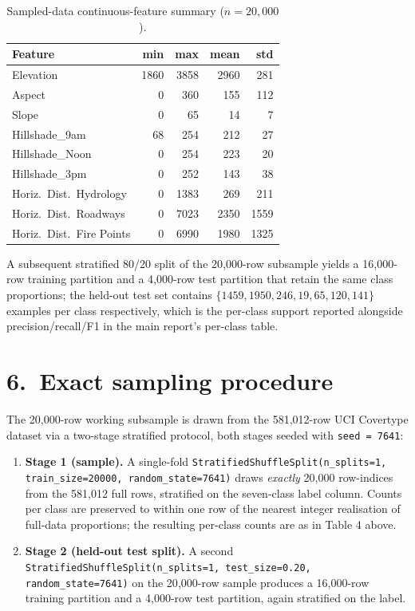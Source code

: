 \documentclass[11pt]{article}
\begin{document}
\begin{table}[h]\centering
\caption{Sampled-data continuous-feature summary ($n{=}20{,}000$).}
\begin{tabularx}{0.95\linewidth}{Xrrrr}
\toprule
\textcolor{denimdark}{\textbf{Feature}} & \textbf{min} & \textbf{max} & \textbf{mean} & \textbf{std} \\
\midrule
Elevation                   & 1860 & 3858 & 2960 & 281 \\
Aspect                      &    0 &  360 &  155 & 112 \\
Slope                       &    0 &   65 &   14 &   7 \\
Hillshade\_9am              &   68 &  254 &  212 &  27 \\
Hillshade\_Noon             &    0 &  254 &  223 &  20 \\
Hillshade\_3pm              &    0 &  252 &  143 &  38 \\
Horiz.\ Dist.\ Hydrology    &    0 & 1383 &  269 & 211 \\
Horiz.\ Dist.\ Roadways     &    0 & 7023 & 2350 & 1559 \\
Horiz.\ Dist.\ Fire Points  &    0 & 6990 & 1980 & 1325 \\
\bottomrule
\end{tabularx}
\end{table}

A subsequent stratified 80/20 split of the 20{,}000-row subsample yields a
16{,}000-row training partition and a 4{,}000-row test partition that retain
the same class proportions; the held-out test set contains
$\{1459, 1950, 246, 19, 65, 120, 141\}$ examples per class respectively,
which is the per-class support reported alongside precision/recall/F1 in
the main report's per-class table.

\section*{6.\ Exact sampling procedure}

The 20{,}000-row working subsample is drawn from the 581{,}012-row UCI
Covertype dataset via a two-stage stratified protocol, both stages seeded
with \texttt{seed = 7641}:

\begin{enumerate}[leftmargin=*]
  \item \textbf{Stage 1 (sample).} A single-fold
        \texttt{StratifiedShuffleSplit(n\_splits=1, train\_size=20000,
        random\_state=7641)} draws \emph{exactly} 20{,}000 row-indices from
        the 581{,}012 full rows, stratified on the seven-class label
        column. Counts per class are preserved to within one row of the
        nearest integer realisation of full-data proportions; the resulting
        per-class counts are as in Table 4 above.
  \item \textbf{Stage 2 (held-out test split).} A second
        \texttt{StratifiedShuffleSplit(n\_splits=1, test\_size=0.20,
        random\_state=7641)} on the 20{,}000-row sample produces a
        16{,}000-row training partition and a 4{,}000-row test partition,
        again stratified on the label.
\end{enumerate}
\end{document}
